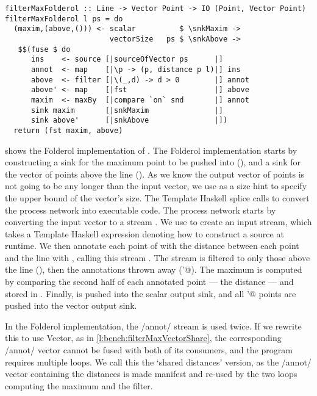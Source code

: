 \begin{lstlisting}[float,label=l:bench:filterMaxFolderol,caption=Folderol implementation of \Hs/filterMax/]
filterMaxFolderol :: Line -> Vector Point -> IO (Point, Vector Point)
filterMaxFolderol l ps = do
  (maxim,(above,())) <- scalar          $ \snkMaxim ->
                        vectorSize   ps $ \snkAbove ->
   $$(fuse $ do
      ins    <- source [|sourceOfVector ps      |]
      annot  <- map    [|\p -> (p, distance p l)|] ins
      above  <- filter [|\(_,d) -> d > 0        |] annot
      above' <- map    [|fst                    |] above
      maxim  <- maxBy  [|compare `on` snd       |] annot
      sink maxim       [|snkMaxim               |]
      sink above'      [|snkAbove               |])
  return (fst maxim, above)
\end{lstlisting}

 shows the Folderol implementation of \Hs@filterMax@.
The Folderol implementation starts by constructing a sink for the maximum point to be pushed into (\Hs@snkMaxim@), and a sink for the vector of points above the line (\Hs@snkAbove@).
As we know the output vector of points is not going to be any longer than the input vector, we use \Hs@vectorSize@ as a size hint to specify the upper bound of the vector's size.
The Template Haskell splice calls \Hs@fuse@ to convert the process network into executable code.
The process network starts by converting the input vector \Hs@pts@ to a stream \Hs@ins@.
We use \Hs@source@ to create an input stream, which takes a Template Haskell expression denoting how to construct a source at runtime.
We then annotate each point of \Hs@ins@ with the distance between each point and the line with \Hs@map@, calling this stream \Hs@annot@.
The \Hs@annot@ stream is filtered to only those above the line (\Hs@above@), then the annotations thrown away (\Hs@above'@).
The maximum is computed by comparing the second half of each annotated point --- the distance --- and stored in \Hs@maxim@.
Finally, \Hs@maxim@ is pushed into the scalar output sink, and all \Hs@above'@ points are pushed into the vector output sink.


In the Folderol implementation, the \Hs/annot/ stream is used twice.
If we rewrite this to use Vector, as in \cref{l:bench:filterMaxVectorShare}, the corresponding \Hs/annot/ vector cannot be fused with both of its consumers, and the program requires multiple loops.
We call this the `shared distances' version, as the \Hs/annot/ vector containing the distances is made manifest and re-used by the two loops computing the maximum and the filter.

